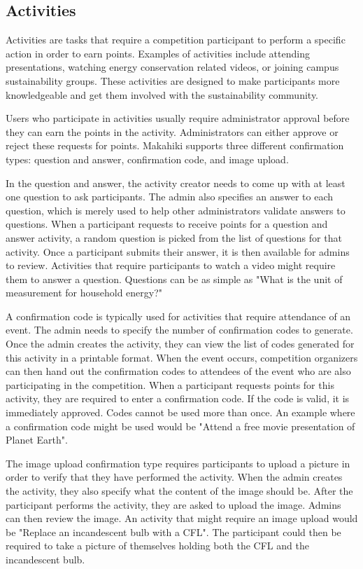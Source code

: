 \subsection{Activities}

Activities are tasks that require a competition participant to perform a specific action in order to earn points.  Examples of activities include attending presentations, watching energy conservation related videos, or joining campus sustainability groups.  These activities are designed to make participants more knowledgeable and get them involved with the sustainability community.

Users who participate in activities usually require administrator approval before they can earn the points in the activity.  Administrators can either approve or reject these requests for points.  Makahiki supports three different confirmation types: question and answer, confirmation code, and image upload.

In the question and answer, the activity creator needs to come up with at least one question to ask participants.  The admin also specifies an answer to each question, which is merely used to help other administrators validate answers to questions.  When a participant requests to receive points for a question and answer activity, a random question is picked from the list of questions for that activity.  Once a participant submits their answer, it is then available for admins to review.  Activities that require participants to watch a video might require them to answer a question.  Questions can be as simple as "What is the unit of measurement for household energy?"

A confirmation code is typically used for activities that require attendance of an event.  The admin needs to specify the number of confirmation codes to generate.  Once the admin creates the activity, they can view the list of codes generated for this activity in a printable format.  When the event occurs, competition organizers can then hand out the confirmation codes to attendees of the event who are also participating in the competition.  When a participant requests points for this activity, they are required to enter a confirmation code.  If the code is valid, it is immediately approved.  Codes cannot be used more than once.  An example where a confirmation code might be used would be "Attend a free movie presentation of Planet Earth".

The image upload confirmation type requires participants to upload a picture in order to verify that they have performed the activity.  When the admin creates the activity, they also specify what the content of the image should be.  After the participant performs the activity, they are asked to upload the image.  Admins can then review the image.  An activity that might require an image upload would be "Replace an incandescent bulb with a CFL".  The participant could then be required to take a picture of themselves holding both the CFL and the incandescent bulb.

